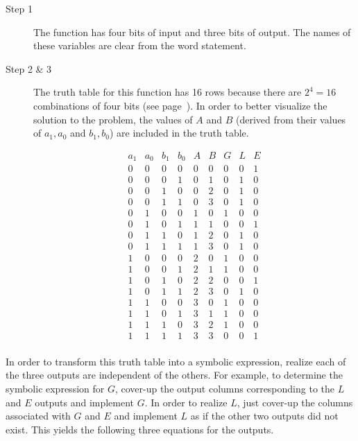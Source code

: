\begin{description}
\item [Step 1] The function has four bits of input and three bits of output.
The names of these variables are clear from the word statement.

\item[Step 2 \& 3]  The truth table for this function has 16 rows
because there are $2^4=16$ combinations of four bits 
(see page~\pageref{page:two-to-N}).
In order to better visualize the solution to the problem, the values of $A$ and
$B$ (derived from their values of $a_1,a_0$ and $b_1,b_0$) are included 
in the truth table.  

$$\begin{array}{c|c|c|c||c|c||c|c|c}
a_1 & a_0 & b_1 & b_0 & A & B & G & L & E \\ \hline
0 & 0 & 0 & 0 & 0 & 0 & 0 & 0 & 1  \\ \hline
0 & 0 & 0 & 1 & 0 & 1 & 0 & 1 & 0  \\ \hline
0 & 0 & 1 & 0 & 0 & 2 & 0 & 1 & 0  \\ \hline
0 & 0 & 1 & 1 & 0 & 3 & 0 & 1 & 0  \\ \hline
0 & 1 & 0 & 0 & 1 & 0 & 1 & 0 & 0  \\ \hline
0 & 1 & 0 & 1 & 1 & 1 & 0 & 0 & 1  \\ \hline
0 & 1 & 1 & 0 & 1 & 2 & 0 & 1 & 0  \\ \hline
0 & 1 & 1 & 1 & 1 & 3 & 0 & 1 & 0  \\ \hline
1 & 0 & 0 & 0 & 2 & 0 & 1 & 0 & 0  \\ \hline
1 & 0 & 0 & 1 & 2 & 1 & 1 & 0 & 0  \\ \hline
1 & 0 & 1 & 0 & 2 & 2 & 0 & 0 & 1  \\ \hline
1 & 0 & 1 & 1 & 2 & 3 & 0 & 1 & 0  \\ \hline
1 & 1 & 0 & 0 & 3 & 0 & 1 & 0 & 0  \\ \hline
1 & 1 & 0 & 1 & 3 & 1 & 1 & 0 & 0  \\ \hline
1 & 1 & 1 & 0 & 3 & 2 & 1 & 0 & 0  \\ \hline
1 & 1 & 1 & 1 & 3 & 3 & 0 & 0 & 1  \\ 
\end{array}$$
\end{description}

In order to transform this truth table into a symbolic expression, 
realize each of the three outputs are independent of the
others.  For example, to determine the symbolic expression for $G$,
cover-up the output columns corresponding to the $L$ and $E$ outputs
and implement $G$.  In order to realize $L$, just cover-up the 
columns associated with $G$ and $E$ and implement $L$ as if
the other two outputs did not exist.  This yields the following
three equations for the outputs.

